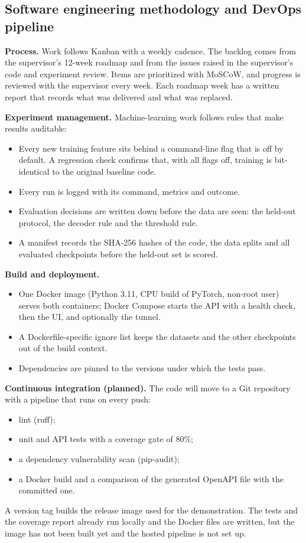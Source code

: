 \documentclass[11pt,a4paper]{article}
\begin{document}
\subsection{Software engineering methodology and DevOps pipeline}

\textbf{Process.} Work follows Kanban with a weekly cadence. The backlog comes from the supervisor's 12-week roadmap and from the issues raised in the supervisor's code and experiment review. Items are prioritized with MoSCoW, and progress is reviewed with the supervisor every week. Each roadmap week has a written report that records what was delivered and what was replaced.

\textbf{Experiment management.} Machine-learning work follows rules that make results auditable:
\begin{itemize}
\item Every new training feature sits behind a command-line flag that is off by default. A regression check confirms that, with all flags off, training is bit-identical to the original baseline code.
\item Every run is logged with its command, metrics and outcome.
\item Evaluation decisions are written down before the data are seen: the held-out protocol, the decoder rule and the threshold rule.
\item A manifest records the SHA-256 hashes of the code, the data splits and all evaluated checkpoints before the held-out set is scored.
\end{itemize}

\textbf{Build and deployment.}
\begin{itemize}
\item One Docker image (Python 3.11, CPU build of PyTorch, non-root user) serves both containers; Docker Compose starts the API with a health check, then the UI, and optionally the tunnel.
\item A Dockerfile-specific ignore list keeps the datasets and the other checkpoints out of the build context.
\item Dependencies are pinned to the versions under which the tests pass.
\end{itemize}

\textbf{Continuous integration (planned).} The code will move to a Git repository with a pipeline that runs on every push:
\begin{itemize}
\item lint (ruff);
\item unit and API tests with a coverage gate of 80\%;
\item a dependency vulnerability scan (pip-audit);
\item a Docker build and a comparison of the generated OpenAPI file with the committed one.
\end{itemize}
A version tag builds the release image used for the demonstration. The tests and the coverage report already run locally and the Docker files are written, but the image has not been built yet and the hosted pipeline is not set up.
\end{document}
